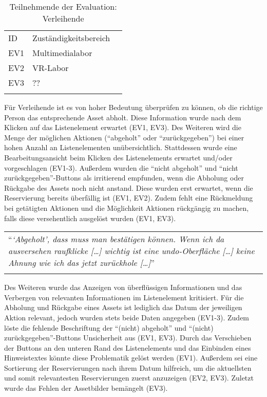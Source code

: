 \begin{table}[h]
        \centering
        \caption{Teilnehmende der Evaluation: Verleihende}
        \begin{tabular}{lll}
                \arrayrulecolor{maincolor}\hline
                \sffamily\color{maincolor}ID &
                \sffamily\color{maincolor}Zuständigkeitsbereich \\
                \arrayrulecolor{maincolor}\hline
                EV1                          & Multimedialabor  \\
                EV2                          & VR-Labor         \\
                EV3                          & ??               \\
                \arrayrulecolor{maincolor}\hline
        \end{tabular}
        \label{table:vzwei}
\end{table}

Für Verleihende ist es von hoher Bedeutung überprüfen zu können, ob die richtige Person das
entsprechende Asset abholt. Diese Information wurde nach dem Klicken auf das Listenelement erwartet
(EV1, EV3). Des Weiteren wird die Menge der möglichen Aktionen (\enquote{abgeholt} oder
\enquote{zurückgegeben}) bei einer hohen Anzahl an Listenelementen unübersichtlich. Stattdessen
wurde eine Bearbeitungsansicht beim Klicken des Listenelements erwartet und/oder vorgeschlagen
(EV1-3). Außerdem wurden die \enquote{nicht abgeholt} und \enquote{nicht zurückgegeben}-Buttons als
irritierend empfunden, wenn die Abholung oder Rückgabe des Assets noch nicht anstand. Diese wurden
erst erwartet, wenn die Reservierung bereits überfällig ist (EV1, EV2). Zudem fehlt eine Rückmeldung
bei getätigten Aktionen und die Möglichkeit Aktionen rückgängig zu machen, falls diese versehentlich
ausgelöst wurden (EV1, EV3).

\begin{longtable}{p{}} \arrayrulecolor{maincolor}\hline
        \enquote{\textit{\enquote{Abgeholt}, dass muss man bestätigen können. Wenn ich
        da ausversehen raufklicke [\dots] wichtig ist eine undo-Oberfläche [\dots]
        keine Ahnung wie ich das jetzt zurückhole [\dots]}} \\
        \arrayrulecolor{maincolor}\hline
\end{longtable}

Des Weiteren wurde das Anzeigen von überflüssigen Informationen und das Verbergen von relevanten
Informationen im Listenelement kritisiert. Für die Abholung und Rückgabe eines Assets ist lediglich
das Datum der jeweiligen Aktion relevant, jedoch wurden stets beide Daten angegeben (EV1-3). Zudem
löste die fehlende Beschriftung der \enquote{(nicht) abgeholt} und \enquote{(nicht)
        zurückgegeben}-Buttons Unsicherheit aus (EV1, EV3). Durch das Verschieben der Buttons an den unteren
Rand des Listenelements und das Einbinden eines Hinweistextes könnte diese Problematik gelöst
werden (EV1). Außerdem sei eine Sortierung der Reservierungen nach ihrem Datum hilfreich, um die
aktuellsten und somit relevantesten Reservierungen zuerst anzuzeigen (EV2, EV3). Zuletzt wurde das Fehlen
der Assetbilder bemängelt (EV3).

